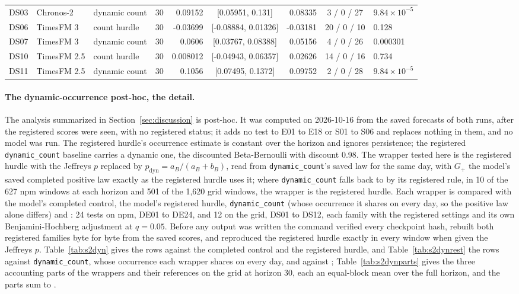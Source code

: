 \begin{table}[htbp]
\begin{tabular}{lllrrcrcl}
DS03 & Chronos-2 & dynamic count & 30 & 0.09152 & [0.05951, 0.131] & 0.08335 & 3 / 0 / 27 & $9.84 \times 10^{-5}$ \\
DS06 & TimesFM 3 & count hurdle & 30 & -0.03699 & [-0.08884, 0.01326] & -0.03181 & 20 / 0 / 10 & 0.128 \\
DS07 & TimesFM 3 & dynamic count & 30 & 0.0606 & [0.03767, 0.08388] & 0.05156 & 4 / 0 / 26 & 0.000301 \\
DS10 & TimesFM 2.5 & count hurdle & 30 & 0.008012 & [-0.04943, 0.06357] & 0.02626 & 14 / 0 / 16 & 0.734 \\
DS11 & TimesFM 2.5 & dynamic count & 30 & 0.1056 & [0.07495, 0.1372] & 0.09752 & 2 / 0 / 28 & $9.84 \times 10^{-5}$ \\
\bottomrule
\end{tabular}
\end{table}

\paragraph{The dynamic-occurrence post-hoc, the detail.} The analysis summarized in
Section~\ref{sec:discussion} is post-hoc. It was computed on 2026-10-16 from the saved forecasts of both
runs, after the registered scores were seen, with no registered status; it adds no test to E01 to E18 or
S01 to S06 and replaces nothing in them, and no model was run. The registered hurdle's occurrence estimate is constant over
the horizon and ignores persistence; the registered \texttt{dynamic\_count} baseline carries a dynamic one,
the discounted Beta-Bernoulli with discount 0.98. The wrapper tested here is the registered hurdle with the
Jeffreys $p$ replaced by $p_{\text{dyn}} = a_B / (a_B + b_B)$, read from \texttt{dynamic\_count}'s saved law
for the same day, with $G_+$ the model's saved completed positive law exactly as the registered hurdle uses
it; where \texttt{dynamic\_count} falls back to \hc{} by its registered rule, in 10 of the 627 npm windows
at each horizon and 501 of the 1,620 grid windows, the wrapper is the registered hurdle. Each wrapper is
compared with the model's completed control, the model's registered hurdle, \texttt{dynamic\_count} (whose
occurrence it shares on every day, so the positive law alone differs) and \hc{}: 24 tests on npm, DE01 to
DE24, and 12 on the grid, DS01 to DS12, each family with the registered settings and its own
Benjamini-Hochberg adjustment at $q = 0.05$. Before any output was written the command verified every
checkpoint hash, rebuilt both registered families byte for byte from the saved scores, and reproduced the
registered hurdle exactly in every window when given the Jeffreys $p$. Table~\ref{tab:s2dyn} gives the rows
against the completed control and the registered hurdle, and Table~\ref{tab:s2dynrest} the rows against
\texttt{dynamic\_count}, whose occurrence each wrapper shares on every day, and against \hc{};
Table~\ref{tab:s2dynparts} gives the three accounting parts of the wrappers and their references on the
grid at horizon 30, each an equal-block mean over the full horizon, and the parts sum to \qs{}.

